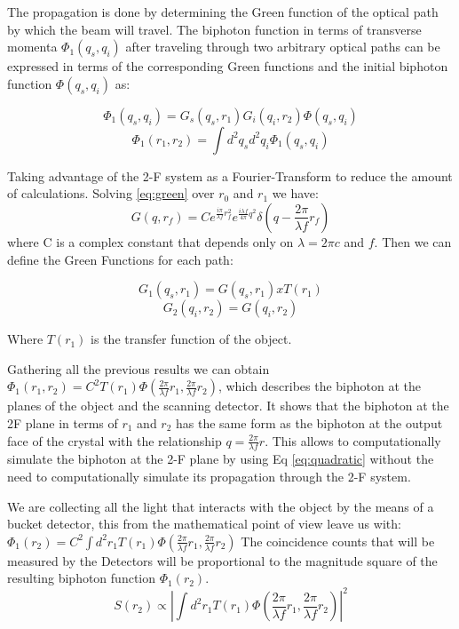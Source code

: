 The propagation is done by determining the Green function\cite{green} of the optical path
by which the beam will travel. The biphoton function
in terms of transverse momenta $\Phi_1 (q_s , q_i )$ after traveling
through two arbitrary optical paths can be expressed
in terms of the corresponding Green functions and the
initial biphoton function $\Phi(q_s , q_i )$ as:

\begin{equation}
\Phi_1 (q_s , q_i )= G_s(q_s,r_1) G_i(q_i,r_2) \Phi (q_s,q_i) 
\end{equation}
\begin{equation}
\Phi_1 (r_1 , r_2 )= \int d^2 q_s d^2 q_i \Phi_1 (q_s , q_i ) 
\end{equation}

Taking advantage of the 2-F system as a Fourier-Transform to reduce the amount of calculations. Solving \ref{eq:green} over $r_0$ and $r_1$ we have:
\begin{equation}
G(q,r_f)=C e^{\frac{i \pi}{\lambda f} r_f^2} e^{\frac{i \lambda f}{4 \pi} q^2} \delta ( q - \frac{2 \pi}{\lambda f}r_f)
\end{equation}
where C is a complex constant that depends only on $\lambda = 2\pi c$ and $f$. Then we can define the Green Functions for each path:

\begin{equation}
G_1(q_s,r_1)=G(q_s,r_1) x T(r_1) 
\end{equation}
\begin{equation}
G_2(q_i,r_2)=G(q_i,r_2)
\end{equation}

Where $T(r_1)$ is the transfer function of the object.

Gathering all the previous results we can obtain $\Phi_1 (r_1 , r_2 )=C^2 T(r_1) \Phi (\frac{2 \pi}{\lambda f}r_1, \frac{2 \pi}{\lambda f}r_2)$, which describes the biphoton at the planes of the object and the scanning detector. It shows that the biphoton at the 2F plane in terms of
$r_1$ and $r_2$  has the same form as the biphoton at the
output face of the crystal with the relationship $q = \frac{2 \pi}{\lambda f} r$.
This allows to computationally simulate the biphoton at the 2-F plane by using Eq \ref{eq:quadratic} without the need to computationally simulate its propagation through the 2-F system.

We are collecting all the light that interacts with the object by the means of a bucket detector, this from the mathematical point of view leave us with: 
 $\Phi_1 (r_2) = C^2 \int d^2 r_1 T(r_1) \Phi (\frac{2 \pi}{\lambda f}r_1, \frac{2 \pi}{\lambda f}r_2)$ 
The coincidence counts that will be measured by the Detectors will be proportional to the magnitude square of the resulting biphoton function $\Phi_1 (r_2)$.
\begin{equation}
S(r_2) \propto |  \int d^2 r_1 T(r_1) \Phi (\frac{2 \pi}{\lambda f}r_1, \frac{2 \pi}{\lambda f}r_2) |^2
\end{equation}

